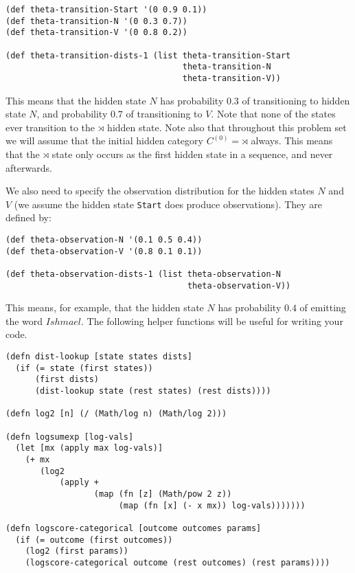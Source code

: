 \documentclass[10pt]{article}
\begin{document}
\begin{lstlisting}
(def theta-transition-Start '(0 0.9 0.1))
(def theta-transition-N '(0 0.3 0.7))
(def theta-transition-V '(0 0.8 0.2))

(def theta-transition-dists-1 (list theta-transition-Start
                                    theta-transition-N
                                    theta-transition-V))
\end{lstlisting}

This means that the hidden state $N$ has probability $0.3$ of transitioning to
hidden state $N$, and probability $0.7$ of transitioning to $V$. Note that none
of the states ever transition to the $\rtimes$ hidden state.  Note also
that throughout this problem set we will assume that the initial hidden category
$C^{(0)}=\rtimes$ always.  This means that the $\rtimes$ state only occurs as
the first hidden state in a sequence, and never afterwards.

We also need to specify the observation distribution for the hidden
states $N$ and $V$ (we assume the hidden state \texttt{Start} does produce
observations). They are defined by:

\begin{lstlisting}
(def theta-observation-N '(0.1 0.5 0.4))
(def theta-observation-V '(0.8 0.1 0.1))

(def theta-observation-dists-1 (list theta-observation-N
                                     theta-observation-V))
\end{lstlisting}

This means, for example, that the hidden state $N$ has probability
$0.4$ of emitting the word $Ishmael$. The following helper functions
will be useful for writing your code.

\begin{lstlisting}
(defn dist-lookup [state states dists]
  (if (= state (first states))
      (first dists)
      (dist-lookup state (rest states) (rest dists))))

(defn log2 [n] (/ (Math/log n) (Math/log 2)))

(defn logsumexp [log-vals]
  (let [mx (apply max log-vals)]
    (+ mx
       (log2
           (apply +
                  (map (fn [z] (Math/pow 2 z))
                       (map (fn [x] (- x mx)) log-vals)))))))

(defn logscore-categorical [outcome outcomes params]
  (if (= outcome (first outcomes))
    (log2 (first params))
    (logscore-categorical outcome (rest outcomes) (rest params))))
\end{lstlisting}
\end{document}
